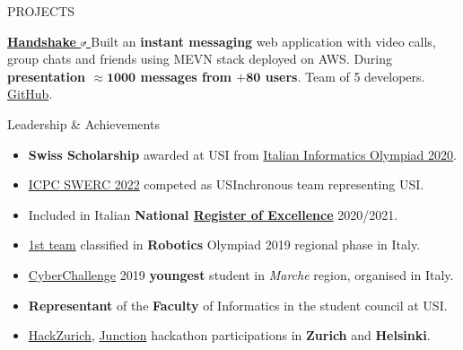 \documentclass{cv} %
\def\intraexpvspace{0.15cm}
\begin{document}
\begin{minipage}[b][0.9\paperheight][t]{0.7\linewidth}
\begin{rSection}{PROJECTS}
    \vspace{\intraexpvspace}
    \item \textbf{\href{https://handshakeapp.ch}{
            Handshake
            \includegraphics[width=0.15cm, trim={10cm -10cm 0cm 0cm}]{ext-link-icon.png}
        }}
    {Built an \textbf{instant messaging} web application with video calls, group chats and friends
        using MEVN stack deployed on AWS.
        During \textbf{presentation $\boldsymbol{\approx1000}$ messages from $\boldsymbol{+ 80}$ users}.
        Team of 5 developers.
        \href{https://github.com/ogs-at-usi/handshake}{GitHub}.
    }%
\end{rSection}
\begin{rSection}{Leadership \& Achievements}
    \vspace{0.2cm}
    \begin{itemize}[leftmargin=*]
        \itemsep 0.2em 
    \item \textbf{Swiss Scholarship} awarded at USI from 
        \href{https://www.olimpiadi-informatica.it/index.php/selezione-territoriale-20.html}{Italian Informatics Olympiad 2020}.

    \item \href{https://icpc.global/ICPCID/ZOI3HF9XDUH8}{ICPC SWERC 2022}
        competed as USInchronous team representing USI. %

    \item Included in Italian \textbf{National \href{https://www.indire.it/eccellenze/}{Register of Excellence}} 2020/2021.

    \item \href{https://www.makerslab.it/olimpiadi-robotiche-ancona-2019/}{1st team}
        classified in \textbf{Robotics} Olympiad 2019 regional phase in Italy.

    \item \href{https://cyberchallenge.it/}{CyberChallenge} 2019 \textbf{youngest} student
        in \textit{Marche} region, organised in Italy. 

    \item \textbf{Representant} of the \textbf{Faculty} of Informatics in the student council at USI.

    \item \href{https://hackzurich.com/}{HackZurich}, 
        \href{https://www.junction2023.com/}{Junction} 
        hackathon participations in \textbf{Zurich} and \textbf{Helsinki}.
    \end{itemize}
\end{rSection}

\end{minipage}
\end{document}
